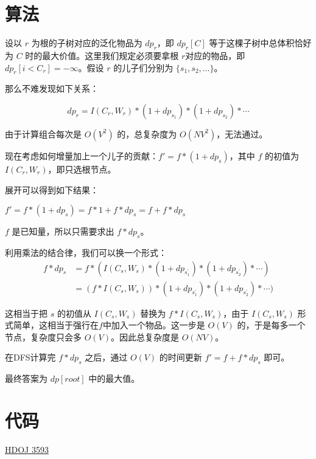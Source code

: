 \documentclass{article}
\begin{document}
\section{算法}

设以 $r$ 为根的子树对应的泛化物品为 $dp_r$，即 $dp_r[C]$ 等于这棵子树中总体积恰好为 $C$ 时的最大价值。这里我们规定必须要拿根 $r$对应的物品，即 $dp_r[i<C_r] = -\infty$。假设 $r$ 的儿子们分别为 $\{s_1,s_2,\ldots \}$。

那么不难发现如下关系：

$$
dp_r = I(C_r,W_r) * (1+dp_{s_1})* (1+dp_{s_2}) * \cdots
$$

由于计算组合每次是 $O(V^2)$ 的，总复杂度为 $O(NV^2)$，无法通过。

现在考虑如何增量加上一个儿子的贡献：$f' = f * (1+dp_s)$，其中 $f$ 的初值为 $I(C_r,W_r)$，即只选根节点。

展开可以得到如下结果：
\begin{center}
    $f' = f * (1+dp_s) = f*1 + f*dp_s = f + f*dp_s$
\end{center}

$f$ 是已知量，所以只需要求出 $f*dp_s$。

利用乘法的结合律，我们可以换一个形式：
\begin{align*}
    f*dp_s
    &= f * (I(C_s,W_s) * (1+dp_{s_{1}^{\prime}})* (1+dp_{s_2^{\prime}}) * \cdots)\\
    &= (f * I(C_s,W_s)) * (1+dp_{s_{1}^{\prime}})* (1+dp_{s_2^{\prime}}) * \cdots)
\end{align*}

这相当于把 $s$ 的初值从 $I(C_s,W_s)$ 替换为 $f * I(C_s,W_s)$，由于 $I(C_s,W_s)$ 形式简单，这相当于强行在$f$中加入一个物品。这一步是 $O(V)$ 的，于是每多一个节点，复杂度只会多 $O(V)$。因此总复杂度是 $O(NV)$。

在DFS计算完 $f*dp_s$ 之后，通过 $O(V)$ 的时间更新 $f' = f+f*dp_s$ 即可。

最终答案为 $dp[root]$ 中的最大值。

\section{代码}
\href{https://gist.github.com/SamZhangQingChuan/7c15974f308a45d6fcb114d029b4eda8}{HDOJ 3593}
\end{document}
